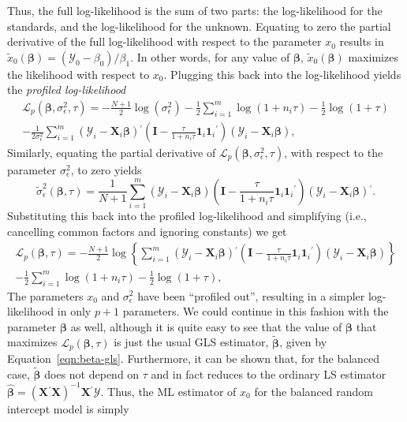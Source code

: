 \documentclass[cmfont,usenames,dvipsnames,leqno]{afit-etd}\usepackage[]{graphicx}\usepackage[]{color}
\newcommand{\loglik}{\mathscr{L}}
\newcommand{\trans}{\ensuremath{^\prime}}
\newcommand{\bc}[1]{\ensuremath{\bm{\mathcal{#1}}}}
\newcommand{\mc}[1]{\ensuremath{\mathcal{#1}}}
\newcommand{\wh}[1]{\ensuremath{\widehat{#1}}}
\newcommand{\X}{\ensuremath{\bm{X}}}
\begin{document}
Thus, the full log-likelihood is the sum of two parts: the log-likelihood for the standards, and the log-likelihood for the unknown. Equating to zero the partial derivative of the full log-likelihood with respect to the parameter $x_0$ results in $\widetilde{x}_0\left(\bm{\beta}\right) = \left(\mc{Y}_0 - \beta_0\right)/\beta_1$. In other words, for any value of $\bm{\beta}$, $\widetilde{x}_0\left(\bm{\beta}\right)$ maximizes the likelihood with respect to $x_0$. Plugging this back into the log-likelihood yields the \textit{profiled log-likelihood}
\begin{multline*}
  \loglik_p\left(\bm{\beta}, \sigma_\epsilon^2, \tau\right) = -\frac{N+1}{2}\log\left(\sigma_\epsilon^2\right) - \frac{1}{2}\sum_{i = 1}^m \log\left(1 + n_i\tau\right) - \frac{1}{2}\log\left(1 + \tau\right) \\ - \frac{1}{2\sigma_\epsilon^2}\sum_{i = 1}^m \left(\bc{Y}_i - \X_i\bm{\beta}\right)\trans\left(\bm{I} - \frac{\tau}{1 + n_i\tau}\bm{1}_i\bm{1}_i\trans\right)\left(\bc{Y}_i - \X_i\bm{\beta}\right),
\end{multline*}
Similarly, equating the partial derivative of $\loglik_p\left(\bm{\beta}, \sigma_\epsilon^2, \tau\right)$, with respect to the parameter $\sigma_\epsilon^2$, to zero yields 
\begin{equation*}
  \widetilde{\sigma}_\epsilon^2\left(\bm{\beta}, \tau\right) = \frac{1}{N + 1}\sum_{i = 1}^m \left(\bc{Y}_i - \X_i\bm{\beta}\right)\left(\bm{I} - \frac{\tau}{1 + n_i\tau}\bm{1}_i\bm{1}_i\trans\right)\left(\bc{Y}_i - \X_i\bm{\beta}\right)\trans.
\end{equation*}
Substituting this back into the profiled log-likelihood and simplifying (i.e., cancelling common factors and ignoring constants) we get
\begin{multline*}
  \loglik_p\left(\bm{\beta}, \tau\right) = -\frac{N+1}{2}\log\left\{\sum_{i = 1}^m \left(\bc{Y}_i - \X_i\bm{\beta}\right)\trans\left(\bm{I} - \frac{\tau}{1 + n_i\tau}\bm{1}_i\bm{1}_i\trans\right)\left(\bc{Y}_i - \X_i\bm{\beta}\right)\right\} \\ - \frac{1}{2}\sum_{i = 1}^m \log\left(1 + n_i\tau\right) - \frac{1}{2}\log\left(1 + \tau\right),
\end{multline*}
The parameters $x_0$ and $\sigma_\epsilon^2$ have been ``profiled out'', resulting in a simpler log-likelihood in only $p + 1$ parameters. We could continue in this fashion with the parameter $\bm{\beta}$ as well, although it is quite easy to see that the value of $\bm{\beta}$ that maximizes $\loglik_p\left(\bm{\beta}, \tau\right)$ is just the usual \ac{GLS} estimator, $\widetilde{\bm{\beta}}$, given by Equation~\eqref{eqn:beta-gls}. Furthermore, it can be shown \citep{demidenko_mixed_2013} that, for the balanced case, $\widetilde{\bm{\beta}}$ does not depend on $\tau$ and in fact reduces to the ordinary \ac{LS} estimator $\wh{\bm{\beta}} = \left(\X\trans\X\right)^{-1}\X\trans\bc{Y}$. Thus, the \ac{ML} estimator of $x_0$ for the balanced random intercept model is simply
\end{document}

